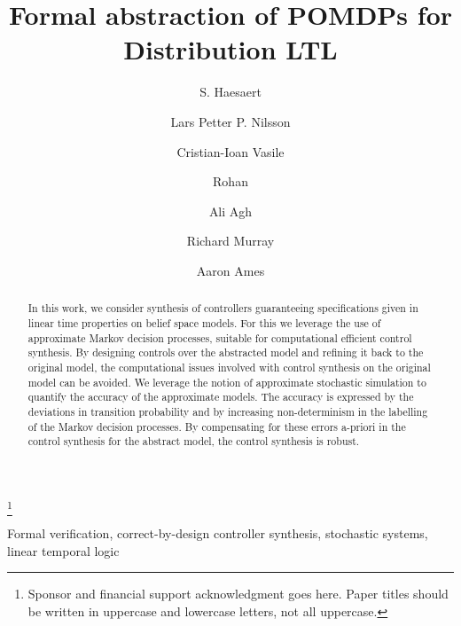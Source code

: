 \documentclass{ifacconf}
\begin{document}
\begin{frontmatter}

\title{\huge Formal abstraction of POMDPs for Distribution LTL}
\thanks[footnoteinfo]{Sponsor and financial support acknowledgment
goes here. Paper titles should be written in uppercase and lowercase
letters, not all uppercase.}

\author[cal]{S. Haesaert} 
\author[cal]{Lars Petter P.  Nilsson} 
\author[mit]{ Cristian-Ioan Vasile}
\author[jpl]{Rohan}
\author[jpl]{ Ali Agh}
\author[cal]{Richard Murray}
\author[cal]{Aaron Ames}

\address[cal]{California Institute of Technology, 
   Pasadena, CA 91125 USA (e-mail: \{haesaert,pettni,ames,murray\}@caltech ).}
\address[mit]{Massachusetts Institute of Technology, 
   Cambridge, MA 02139 USA}%
\address[jpl]{Jet Propulsion Laboratory, 
   Pasadena, CA 91109 USA}%
\maketitle
\begin{abstract}
In this work, we consider synthesis of controllers guaranteeing  specifications given in linear time properties on belief space models.
For this we leverage the use of approximate Markov decision processes, suitable for computational efficient control synthesis. By designing controls over the abstracted model and refining it back to the original model, the computational issues involved with control synthesis on the original model can be avoided. 
We leverage the notion of approximate stochastic simulation  to quantify the accuracy of the approximate models. The accuracy is expressed by the deviations in transition probability and by increasing non-determinism in the labelling of the Markov decision processes.
By compensating for these errors a-priori in the control synthesis for the abstract model, the control synthesis is robust. 

\end{abstract}
\begin{keyword}
Formal verification, correct-by-design controller synthesis, stochastic systems, linear temporal logic
\end{keyword}

\end{frontmatter}
 
\end{document}
